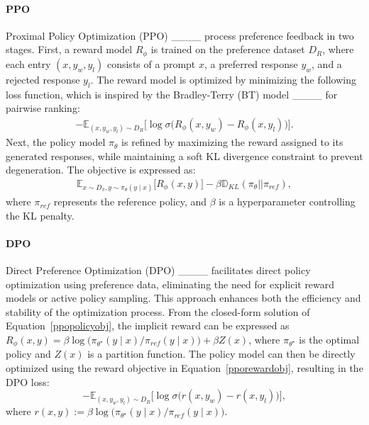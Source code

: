 \paragraph{PPO} Proximal Policy Optimization (PPO) ____ process preference feedback in two stages. First, a reward model \( R_{\phi} \) is trained on the preference dataset \( D_{R} \), where each entry \( (x, y_w, y_l) \) consists of a prompt \( x \), a preferred response \( y_w \), and a rejected response \( y_l \). The reward model is optimized by minimizing the following loss function, which is inspired by the Bradley-Terry (BT) model ____ for pairwise ranking:
\begin{align}
\label{pporewardobj}
- \mathbb{E}_{(x, y_w, y_l) \sim D_{R}} \big[\log \sigma \big(R_{\phi}(x, y_w) - R_{\phi}(x, y_l)\big)\big].
\end{align}
Next, the policy model \( \pi_{\theta} \) is refined by maximizing the reward assigned to its generated responses, while maintaining a soft KL divergence constraint to prevent degeneration. The objective is expressed as:
\begin{align}
\label{ppopolicyobj}
\mathbb{E}_{x \sim D_{\pi}, y \sim \pi_{\theta}(y \mid x)} \big[R_{\phi}(x, y)\big] - \beta \mathbb{D}_{KL} (\pi_{\theta} || \pi_{ref}),
\end{align}
where \( \pi_{ref} \) represents the reference policy, and \( \beta \) is a hyperparameter controlling the KL penalty.




\paragraph{DPO} Direct Preference Optimization (DPO) ____ facilitates direct policy optimization using preference data, eliminating the need for explicit reward models or active policy sampling. This approach enhances both the efficiency and stability of the optimization process. From the closed-form solution of Equation~\ref{ppopolicyobj}, the implicit reward can be expressed as \( R_{\phi}(x, y) =  \beta \log \big(\pi_{\theta^{\star}}(y \mid x) / \pi_{ref}(y \mid x)\big) + \beta Z(x)\), where \( \pi_{\theta^{\star}} \) is the optimal policy and $Z(x)$ is a partition function. The policy model can then be directly optimized using the reward objective in Equation~\ref{pporewardobj}, resulting in the DPO loss:
\[
- \mathbb{E}_{(x, y_w, y_l) \sim D_{R}} \big[\log \sigma \big(r(x, y_w) - r(x, y_l)\big)\big],
\]
where $r(x, y) := \beta \log \big(\pi_{\theta^{\star}}(y \mid x) / \pi_{ref}(y \mid x)\big)$.

